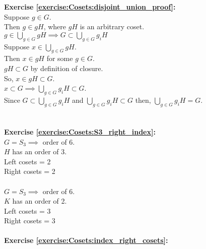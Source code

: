 \noindent\textbf{Exercise \ref{exercise:Cosets:disjoint_union_proof}:} %
\\
Suppose $g \in G$.
\\
Then $g \in gH$, where $gH$ is an arbitrary coset.
\\
\bigskip
$g \in \bigcup\limits_{g \in G} gH \implies G \subset \bigcup\limits_{g \in G} g_iH$
\\
\bigskip
Suppose $x \in \bigcup\limits_{g \in G} gH$.
\\
Then $x \in gH$ for some $ g \in G$.
\\
$gH \subset G$ by definition of closure.
\\
So, $x \in gH \subset G$.
\\
\bigskip
$x \subset G \implies \bigcup\limits_{g \in G} g_iH \subset G$.
\\
Since $G \subset \bigcup\limits_{g \in G} g_iH$ and $\bigcup\limits_{g \in G} g_iH \subset G$ then, $\bigcup\limits_{g \in G} g_iH = G$.
\\
\\
\\
\textbf{Exercise \ref{exercise:Cosets:S3_right_index}:}
\\
$G = S_3 \implies$ order of 6.
\\
$H$ has an order of 3.
\\
Left cosets = 2
\\
Right cosets = 2
\\
\\
$G = S_3 \implies$ order of 6.
\\
$K$ has an order of 2.
\\
Left cosets = 3
\\
Right cosets  = 3
\\
\\
\textbf{Exercise \ref{exercise:Cosets:index_right_cosets}:}
